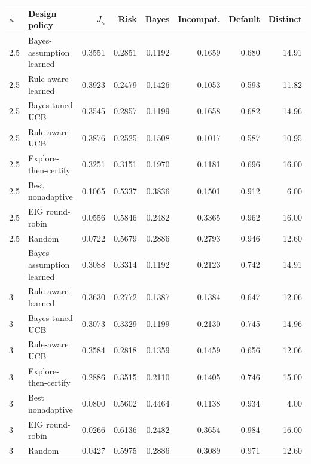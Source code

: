 \begin{tabular}{llrrrrrr}
\toprule
$\kappa$ & Design policy & $J_\kappa$ & Risk & Bayes & Incompat. & Default & Distinct \\
\midrule
2.5 & Bayes-assumption learned & 0.3551 & 0.2851 & 0.1192 & 0.1659 & 0.680 & 14.91 \\
2.5 & Rule-aware learned & 0.3923 & 0.2479 & 0.1426 & 0.1053 & 0.593 & 11.82 \\
2.5 & Bayes-tuned UCB & 0.3545 & 0.2857 & 0.1199 & 0.1658 & 0.682 & 14.96 \\
2.5 & Rule-aware UCB & 0.3876 & 0.2525 & 0.1508 & 0.1017 & 0.587 & 10.95 \\
2.5 & Explore-then-certify & 0.3251 & 0.3151 & 0.1970 & 0.1181 & 0.696 & 16.00 \\
2.5 & Best nonadaptive & 0.1065 & 0.5337 & 0.3836 & 0.1501 & 0.912 & 6.00 \\
2.5 & EIG round-robin & 0.0556 & 0.5846 & 0.2482 & 0.3365 & 0.962 & 16.00 \\
2.5 & Random & 0.0722 & 0.5679 & 0.2886 & 0.2793 & 0.946 & 12.60 \\
\addlinespace
3 & Bayes-assumption learned & 0.3088 & 0.3314 & 0.1192 & 0.2123 & 0.742 & 14.91 \\
3 & Rule-aware learned & 0.3630 & 0.2772 & 0.1387 & 0.1384 & 0.647 & 12.06 \\
3 & Bayes-tuned UCB & 0.3073 & 0.3329 & 0.1199 & 0.2130 & 0.745 & 14.96 \\
3 & Rule-aware UCB & 0.3584 & 0.2818 & 0.1359 & 0.1459 & 0.656 & 12.06 \\
3 & Explore-then-certify & 0.2886 & 0.3515 & 0.2110 & 0.1405 & 0.746 & 15.00 \\
3 & Best nonadaptive & 0.0800 & 0.5602 & 0.4464 & 0.1138 & 0.934 & 4.00 \\
3 & EIG round-robin & 0.0266 & 0.6136 & 0.2482 & 0.3654 & 0.984 & 16.00 \\
3 & Random & 0.0427 & 0.5975 & 0.2886 & 0.3089 & 0.971 & 12.60 \\
\bottomrule
\end{tabular}

